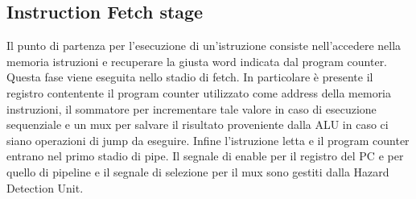 \subsection{Instruction Fetch stage}
Il punto di partenza per l'esecuzione di un'istruzione consiste nell'accedere nella memoria istruzioni e recuperare la giusta word indicata dal program counter. Questa fase viene eseguita nello stadio di fetch. In particolare è presente il registro contentente il program counter utilizzato come address della memoria instruzioni, il sommatore per incrementare tale valore in caso di esecuzione sequenziale e un mux per salvare il risultato proveniente dalla ALU in caso ci siano operazioni di jump da eseguire. Infine l'istruzione letta e il program counter entrano nel primo stadio di pipe. Il segnale di enable per il registro del PC e per quello di pipeline e il segnale di selezione per il mux sono gestiti dalla Hazard Detection Unit.
